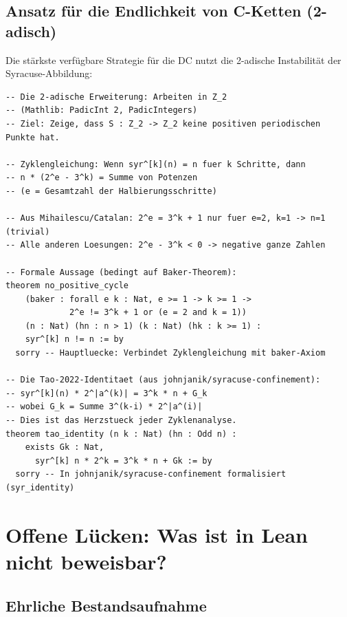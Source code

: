 \documentclass[12pt,a4paper]{article}
\begin{document}
\subsection{Ansatz für die Endlichkeit von C-Ketten (2-adisch)}

Die stärkste verfügbare Strategie für die DC nutzt die 2-adische Instabilität
der Syracuse-Abbildung:

\begin{tcolorbox}[lean, title={Lean\,4-Code: 2-adische Instabilität (Skizze)}]
\begin{lstlisting}
-- Die 2-adische Erweiterung: Arbeiten in Z_2
-- (Mathlib: PadicInt 2, PadicIntegers)
-- Ziel: Zeige, dass S : Z_2 -> Z_2 keine positiven periodischen Punkte hat.

-- Zyklengleichung: Wenn syr^[k](n) = n fuer k Schritte, dann
-- n * (2^e - 3^k) = Summe von Potenzen
-- (e = Gesamtzahl der Halbierungsschritte)

-- Aus Mihailescu/Catalan: 2^e = 3^k + 1 nur fuer e=2, k=1 -> n=1 (trivial)
-- Alle anderen Loesungen: 2^e - 3^k < 0 -> negative ganze Zahlen

-- Formale Aussage (bedingt auf Baker-Theorem):
theorem no_positive_cycle
    (baker : forall e k : Nat, e >= 1 -> k >= 1 ->
             2^e != 3^k + 1 or (e = 2 and k = 1))
    (n : Nat) (hn : n > 1) (k : Nat) (hk : k >= 1) :
    syr^[k] n != n := by
  sorry -- Hauptluecke: Verbindet Zyklengleichung mit baker-Axiom

-- Die Tao-2022-Identitaet (aus johnjanik/syracuse-confinement):
-- syr^[k](n) * 2^|a^(k)| = 3^k * n + G_k
-- wobei G_k = Summe 3^(k-i) * 2^|a^(i)|
-- Dies ist das Herzstueck jeder Zyklenanalyse.
theorem tao_identity (n k : Nat) (hn : Odd n) :
    exists Gk : Nat,
      syr^[k] n * 2^k = 3^k * n + Gk := by
  sorry -- In johnjanik/syracuse-confinement formalisiert (syr_identity)
\end{lstlisting}
\end{tcolorbox}

\section{Offene Lücken: Was ist in Lean nicht beweisbar?}
\label{sec:luecken}

\subsection{Ehrliche Bestandsaufnahme}
\end{document}

